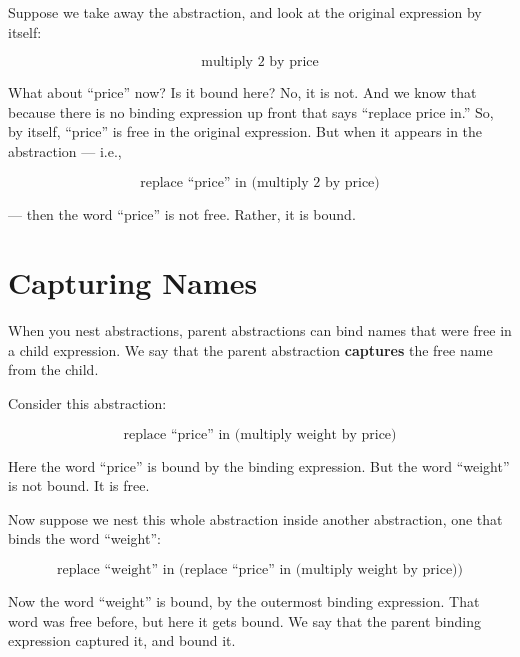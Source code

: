 \documentclass{book}
\numberwithin{equation}{chapter}
\newcommand{\vocab}{\textbf}
\begin{document}
Suppose we take away the abstraction, and look at the original expression by itself:

\begin{equation}
\text{multiply 2 by price}
\end{equation}

\noindent
What about ``price'' now? Is it bound here? No, it is not. And we know that because there is no binding expression up front that says ``replace price in.'' So, by itself, ``price'' is free in the original expression. But when it appears in the abstraction --- i.e., 

\begin{equation}
\text{replace ``price'' in (multiply 2 by price)}
\end{equation}

\noindent
--- then the word ``price'' is not free. Rather, it is bound.


\section{Capturing Names}

When you nest abstractions, parent abstractions can bind names that were free in a child expression. We say that the parent abstraction \vocab{captures} the free name from the child. 

Consider this abstraction:

\begin{equation}
\text{replace ``price'' in (multiply weight by price)}
\end{equation}

\noindent
Here the word ``price'' is bound by the binding expression. But the word ``weight'' is not bound. It is free.

Now suppose we nest this whole abstraction inside another abstraction, one that binds the word ``weight'':

\begin{equation}
\text{replace ``weight'' in (replace ``price'' in (multiply weight by price))}
\end{equation}

\noindent
Now the word ``weight'' is bound, by the outermost binding expression. That word was free before, but here it gets bound. We say that the parent binding expression captured it, and bound it.
\end{document}
